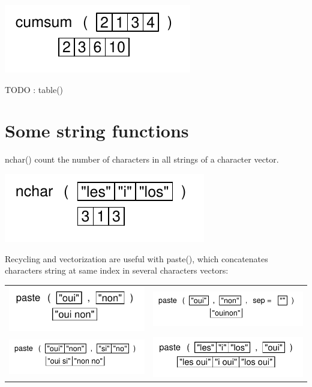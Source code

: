 \documentclass[pdflatex]{article}
\begin{document}
\includegraphics{cumsum}

TODO : table()

\section{Some string functions}

nchar() count the number of characters in all strings of a character vector.

\includegraphics{nchar}

Recycling and vectorization are useful with paste(), which concatenates characters string at same index in several characters vectors:

\begin{tabular}{cc}
\includegraphics{paste} & \includegraphics{paste2}\\
\includegraphics{paste3} & \includegraphics{paste4}\\
\end{tabular}
\end{document}
